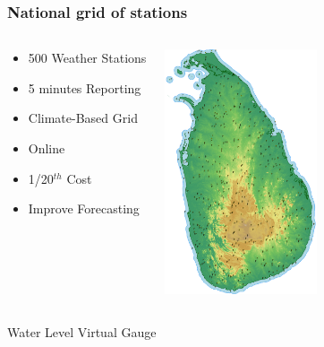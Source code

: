 \documentclass[serif,mathserif]{beamer}
\begin{document}

\begin{frame}
  \frametitle{National grid of stations}
\begin{columns}
\begin{center}
\begin{itemize}
 \item 500 Weather Stations
 \item 5 minutes Reporting
 \item Climate-Based Grid
 \item Online
 \item 1/20$^{th}$ Cost 
 \item Improve Forecasting
\end{itemize}
\end{center}

\begin{center}
 \includegraphics[width=4.5cm]{ws500.png}
\end{center}
\end{columns}
 \vspace{1mm}
\end{frame}


{
\begin{frame}[plain]
\begin{shaded}
Water Level Virtual Gauge
\end{shaded}
\end{frame}}
\end{document}
